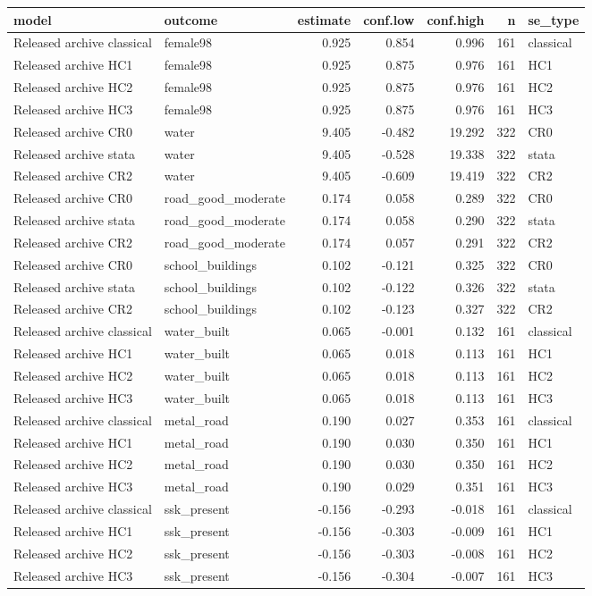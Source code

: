 
\begin{tabular}{llrrrrl}
\toprule
model & outcome & estimate & conf.low & conf.high & n & se\_type\\
\midrule
Released archive classical & female98 & 0.925 & 0.854 & 0.996 & 161 & classical\\
Released archive HC1 & female98 & 0.925 & 0.875 & 0.976 & 161 & HC1\\
Released archive HC2 & female98 & 0.925 & 0.875 & 0.976 & 161 & HC2\\
Released archive HC3 & female98 & 0.925 & 0.875 & 0.976 & 161 & HC3\\
Released archive CR0 & water & 9.405 & -0.482 & 19.292 & 322 & CR0\\
\addlinespace
Released archive stata & water & 9.405 & -0.528 & 19.338 & 322 & stata\\
Released archive CR2 & water & 9.405 & -0.609 & 19.419 & 322 & CR2\\
Released archive CR0 & road\_good\_moderate & 0.174 & 0.058 & 0.289 & 322 & CR0\\
Released archive stata & road\_good\_moderate & 0.174 & 0.058 & 0.290 & 322 & stata\\
Released archive CR2 & road\_good\_moderate & 0.174 & 0.057 & 0.291 & 322 & CR2\\
\addlinespace
Released archive CR0 & school\_buildings & 0.102 & -0.121 & 0.325 & 322 & CR0\\
Released archive stata & school\_buildings & 0.102 & -0.122 & 0.326 & 322 & stata\\
Released archive CR2 & school\_buildings & 0.102 & -0.123 & 0.327 & 322 & CR2\\
Released archive classical & water\_built & 0.065 & -0.001 & 0.132 & 161 & classical\\
Released archive HC1 & water\_built & 0.065 & 0.018 & 0.113 & 161 & HC1\\
\addlinespace
Released archive HC2 & water\_built & 0.065 & 0.018 & 0.113 & 161 & HC2\\
Released archive HC3 & water\_built & 0.065 & 0.018 & 0.113 & 161 & HC3\\
Released archive classical & metal\_road & 0.190 & 0.027 & 0.353 & 161 & classical\\
Released archive HC1 & metal\_road & 0.190 & 0.030 & 0.350 & 161 & HC1\\
Released archive HC2 & metal\_road & 0.190 & 0.030 & 0.350 & 161 & HC2\\
\addlinespace
Released archive HC3 & metal\_road & 0.190 & 0.029 & 0.351 & 161 & HC3\\
Released archive classical & ssk\_present & -0.156 & -0.293 & -0.018 & 161 & classical\\
Released archive HC1 & ssk\_present & -0.156 & -0.303 & -0.009 & 161 & HC1\\
Released archive HC2 & ssk\_present & -0.156 & -0.303 & -0.008 & 161 & HC2\\
Released archive HC3 & ssk\_present & -0.156 & -0.304 & -0.007 & 161 & HC3\\
\bottomrule
\end{tabular}
